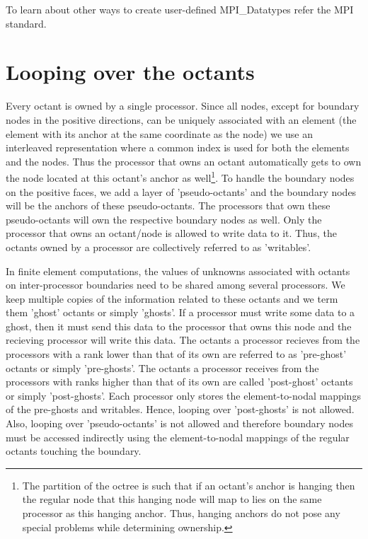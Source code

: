 \documentclass[10pt,reqno,a4paper]{report}
\numberwithin{equation}{section}
\begin{document}
To learn about other ways to create user-defined MPI\_Datatypes refer the MPI standard.

\section{Looping over the octants}
\label{sec:loops}
Every octant is owned by a single processor. Since all nodes, except for boundary nodes in the positive directions, can be uniquely associated with an element (the element with its anchor at the same coordinate as the node) we use an interleaved representation where a common index is used for both the elements and the nodes. Thus the processor that owns an octant automatically gets to own the node located at this octant's anchor as well\footnote{The partition of the octree is such that if an octant's anchor is hanging then the regular node that this hanging node will map to lies on the same processor as this hanging anchor. Thus, hanging anchors do not pose any special problems while determining ownership.}. To handle the boundary nodes on the positive faces, we add a layer of 'pseudo-octants' and the boundary nodes will be the anchors of these pseudo-octants. The processors that own these pseudo-octants will own the respective boundary nodes as well. Only the processor that owns an octant/node is allowed to write data to it. Thus, the octants owned by a processor are collectively referred to as 'writables'.

In finite element computations, the values of unknowns associated with octants on inter-processor boundaries need to be shared among several processors. We keep multiple copies of the information related to these octants and we term them 'ghost' octants or simply 'ghosts'. If a processor must write some data to a ghost, then it must send this data to the processor that owns this node and the recieving processor will write this data. The octants a processor recieves from the processors with a rank lower than that of its own are referred to as 'pre-ghost' octants or simply 'pre-ghosts'. The octants a processor receives from the processors with ranks higher than that of its own are called 'post-ghost' octants or simply 'post-ghosts'. Each processor only stores the element-to-nodal mappings of the pre-ghosts and writables. Hence, looping over 'post-ghosts' is not allowed. Also, looping over 'pseudo-octants' is not allowed and therefore boundary nodes must be accessed indirectly using the element-to-nodal mappings of the regular octants touching the boundary.
\end{document}

